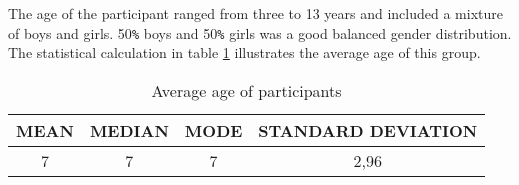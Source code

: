  

The age of the participant ranged from three to 13 years and included a mixture of boys and girls. 50\texttt{\%} boys and 50\texttt{\%} girls was a good balanced gender distribution. The statistical calculation in table  \ref{tab:agestatistic} illustrates the average age of this group.

\begin{table}[h]
    \centering
    \begin{tabular}{c|c|c|c}
    \hline
        \multicolumn{1}{|l|}{MEAN} &
        \multicolumn{1}{l|}{MEDIAN} &
        \multicolumn{1}{l|}{MODE} &
        \multicolumn{1}{l|}{STANDARD DEVIATION}\\ \hline
        \multicolumn{1}{|c|}{7} &
        \multicolumn{1}{c|}{7} &
        \multicolumn{1}{c|}{7} &
        \multicolumn{1}{c|}{2,96} \\ \hline
    \end{tabular}
    \caption{Average age of participants}
    \label{tab:agestatistic}
\end{table}



%

